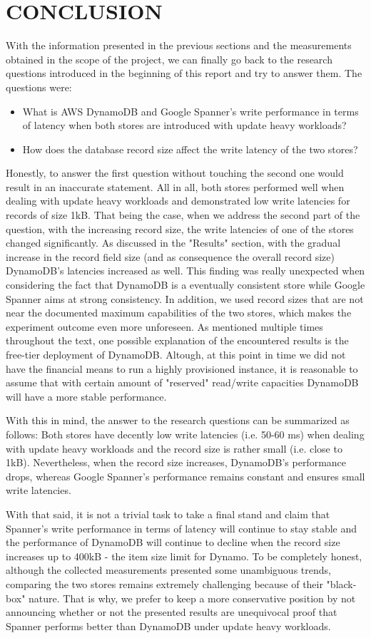 \documentclass[letterpaper, 10 pt, conference]{ieeeconf}  %
\begin{document}
\section{CONCLUSION}
With the information presented in the previous sections and the measurements obtained in the scope of the project, we can finally go back to the research questions introduced in the beginning of this report and try to answer them. The questions were:
\begin{itemize}
    \item What is AWS DynamoDB and Google Spanner’s write performance in terms of latency when both stores are introduced with update heavy workloads? 
    \item How does the database record size affect the write latency of the two stores?  
\end{itemize}
Honestly, to answer the first question without touching the second one would result in an inaccurate statement. All in all, both stores performed well when dealing with update heavy workloads and demonstrated low write latencies for records of size 1kB. That being the case, when we address the second part of the question, with the increasing record size, the write latencies of one of the stores changed significantly. As discussed in the "Results" section, with the gradual increase in the record field size (and as consequence the overall record size) DynamoDB's latencies increased as well. This finding was really unexpected when considering the fact that DynamoDB is a eventually consistent store while Google Spanner aims at strong consistency. In addition, we used record sizes that are not near the documented maximum capabilities of the two stores, which makes the experiment outcome even more unforeseen.
As mentioned multiple times throughout the text, one possible explanation of the encountered results is the free-tier deployment of DynamoDB. Altough, at this point in time we did not have the financial means to run a highly provisioned instance, it is reasonable to assume that with certain amount of "reserved" read/write capacities DynamoDB will have a more stable performance. \par
With this in mind, the answer to the research questions can be summarized as follows:
Both stores have decently low write latencies (i.e. 50-60 ms) when dealing with update heavy workloads and the record size is rather small (i.e. close to 1kB). Nevertheless, when the record size increases, DynamoDB's performance drops, whereas Google Spanner's performance remains constant and ensures small write latencies. \par
With that said, it is not a trivial task to take a final stand and claim that Spanner's write performance in terms of latency will continue to stay stable and the performance of DynamoDB will continue to decline when the record size increases up to 400kB - the item size limit for Dynamo. To be completely honest, although the collected measurements presented some unambiguous trends,  comparing the two stores remains extremely challenging because of their "black-box" nature. That is why, we prefer to keep a more conservative position by not announcing whether or not the presented results are unequivocal proof that Spanner performs better than DynamoDB under update heavy workloads. 
\end{document}
